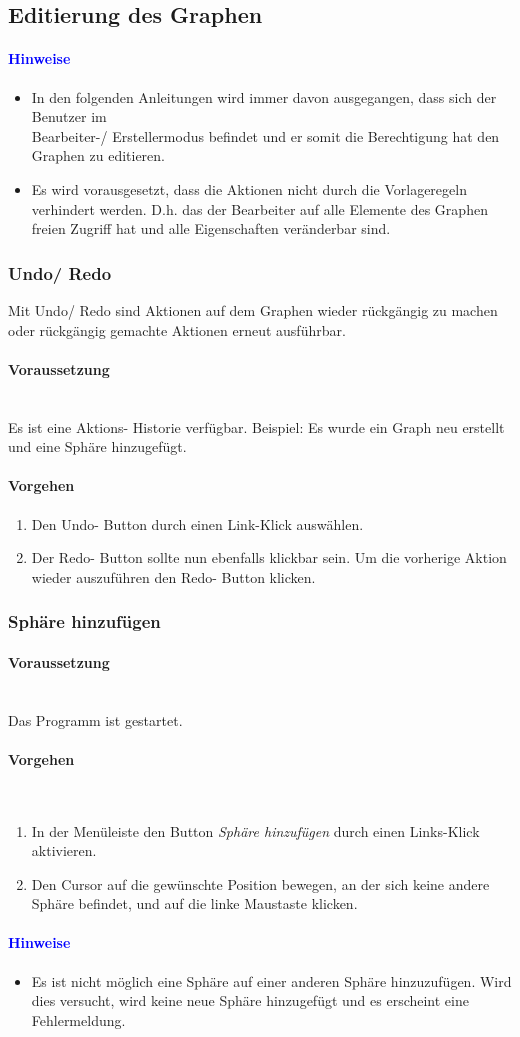 \documentclass[enabledeprecatedfontcommands,fontsize=11pt,paper=a4,twoside]{scrartcl}
\newcounter{one}
\newcommand*{\hint}{\paragraph{\textcolor{blue}{Hinweise}}}
\newcommand*{\condition}{\paragraph{Voraussetzung}$\;$ \vspace{0.2cm}\\}
\newcommand*{\actions}{\paragraph{Vorgehen} $\;$\vspace{0.2cm}\\}
\newcommand*{\action}{\paragraph{Vorgehen}}
\begin{document}
	\subsection{Editierung des Graphen}\label{edit}

		\hint
		\begin{itemize}
			\item In den folgenden Anleitungen wird immer davon ausgegangen, dass sich der Benutzer im \\
			Bearbeiter-/ Erstellermodus befindet und er somit die Berechtigung hat den Graphen zu editieren.
			\item Es wird vorausgesetzt, dass die Aktionen nicht durch die Vorlageregeln verhindert werden. D.h. das der Bearbeiter auf alle Elemente des Graphen freien Zugriff hat und alle Eigenschaften veränderbar sind.
		\end{itemize}
		\subsubsection{Undo/ Redo}
		Mit Undo/ Redo sind Aktionen auf dem Graphen wieder rückgängig zu machen oder rückgängig gemachte Aktionen erneut ausführbar. 
		\condition
		Es ist eine Aktions- Historie verfügbar. Beispiel: Es wurde ein Graph neu erstellt und eine Sphäre hinzugefügt. 	
		\action
		\begin{enumerate}
			\item Den Undo- Button durch einen Link-Klick auswählen. 
			\item Der Redo- Button sollte nun ebenfalls klickbar sein. Um die vorherige Aktion wieder auszuführen den Redo- Button klicken. 
		\end{enumerate}			
		
		\newpage	
		\subsubsection{Sphäre hinzufügen}	
		\condition 	
		Das Programm ist gestartet.
		\actions
		\begin{enumerate}
			\item In der Menüleiste den Button \textit{Sphäre hinzufügen} durch einen Links-Klick aktivieren.
			\item Den Cursor auf die gewünschte Position bewegen, an der sich keine andere Sphäre befindet, und auf die linke Maustaste klicken.
		\end{enumerate}
		\hint
		\begin{itemize}
			\item Es ist nicht möglich eine Sphäre auf einer anderen Sphäre hinzuzufügen. Wird dies versucht, wird keine neue Sphäre hinzugefügt und es erscheint eine Fehlermeldung.
	\end{itemize}
	
\end{document}
